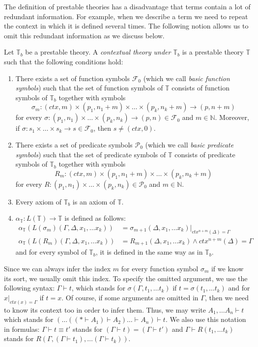 \documentclass[reqno]{amsart}
\theoremstyle{definition}
\theoremstyle{remark}
\newcommand{\emptyCtx}{*}
\numberwithin{figure}{section}
\begin{document}
The definition of prestable theories has a disadvantage that terms contain a lot of redundant information.
For example, when we describe a term we need to repeat the context in which it is defined several times.
The following notion allows us to omit this redundant information as we discuss below.

\begin{defn}
Let $\mathbb{T}_b$ be a prestable theory.
A \emph{contextual theory under $\mathbb{T}_b$} is a prestable theory $\mathbb{T}$ such that the following conditions hold:
\begin{enumerate}
\item There exists a set of function symbols $\mathcal{F}_0$ (which we call \emph{basic function symbols}) such that
the set of function symbols of $\mathbb{T}$ consists of function symbols of $\mathbb{T}_b$ together with symbols
\[ \sigma_m : (ctx,m) \times (p_1,n_1+m) \times \ldots \times (p_k,n_k+m) \to (p,n+m) \]
for every $\sigma : (p_1,n_1) \times \ldots \times (p_k,n_k) \to (p,n) \in \mathcal{F}_0$ and $m \in \mathbb{N}$.
Moreover, if $\sigma : s_1 \times \ldots \times s_k \to s \in \mathcal{F}_0$, then $s \neq (ctx,0)$.
\item There exists a set of predicate symbols $\mathcal{P}_0$ (which we call \emph{basic predicate symbols}) such that
the set of predicate symbols of $\mathbb{T}$ consists of predicate symbols of $\mathbb{T}_b$ together with symbols
\[ R_m : (ctx,m) \times (p_1,n_1+m) \times \ldots \times (p_k,n_k+m) \]
for every $R : (p_1,n_1) \times \ldots \times (p_k,n_k) \in \mathcal{P}_0$ and $m \in \mathbb{N}$.
\item Every axiom of $\mathbb{T}_b$ is an axiom of $\mathbb{T}$.
\item $\alpha_\mathbb{T} : L(\mathbb{T}) \to \mathbb{T}$ is defined as follows:
\begin{align*}
\alpha_\mathbb{T}(L(\sigma_m)(\Gamma, \Delta, x_1, \ldots x_k)) & = \sigma_{m+1}(\Delta, x_1, \ldots x_k)|_{ctx^{n+m}(\Delta) = \Gamma} \\
\alpha_\mathbb{T}(L(R_m)(\Gamma, \Delta, x_1, \ldots x_k)) & = R_{m+1}(\Delta, x_1, \ldots x_k) \land ctx^{n+m}(\Delta) = \Gamma
\end{align*}
and for every symbol of $\mathbb{T}_b$, it is defined in the same way as in $\mathbb{T}_b$.
\end{enumerate}
\end{defn}

Since we can always infer the index $m$ for every function symbol $\sigma_m$ if we know its sort, we usually omit this index.
To specify the omitted argument, we use the following syntax: $\Gamma \vdash t$,
which stands for $\sigma(\Gamma, t_1, \ldots t_k)$ if $t = \sigma(t_1, \ldots t_k)$ and for $x|_{ctx(x) = \Gamma}$ if $t = x$.
Of course, if some arguments are omitted in $\Gamma$, then we need to know its context too in order to infer them.
Thus, we may write $A_1, \ldots A_n \vdash t$ which stands for $(\ldots ((\emptyCtx \vdash A_1) \vdash A_2) \ldots \vdash A_n) \vdash t$.
We also use this notation in formulas: $\Gamma \vdash t \equiv t'$ stands for $(\Gamma \vdash t) = (\Gamma \vdash t')$
and $\Gamma \vdash R(t_1, \ldots t_k)$ stands for $R(\Gamma, (\Gamma \vdash t_1), \ldots (\Gamma \vdash t_k))$.
\end{document}
